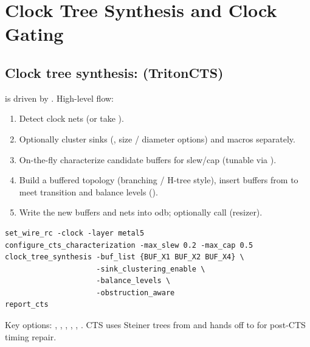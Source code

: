 \chapter{Clock Tree Synthesis and Clock Gating}
\label{ch:cts}


\section{Clock tree synthesis:  (TritonCTS)}

 is driven by . High-level flow:

\begin{enumerate}
  \item Detect clock nets (or take ).
  \item Optionally cluster sinks (, size /
        diameter options) and macros separately.
  \item On-the-fly characterize candidate buffers for slew/cap (tunable via
        ).
  \item Build a buffered topology (branching / H-tree style), insert buffers
        from  to meet transition and balance levels
        ().
  \item Write the new buffers and nets into odb; optionally call
         (resizer).
\end{enumerate}

\begin{lstlisting}[style=ortcl]
set_wire_rc -clock -layer metal5
configure_cts_characterization -max_slew 0.2 -max_cap 0.5
clock_tree_synthesis -buf_list {BUF_X1 BUF_X2 BUF_X4} \
                     -sink_clustering_enable \
                     -balance_levels \
                     -obstruction_aware
report_cts
\end{lstlisting}

Key options: , ,
, , ,
. CTS uses Steiner trees from  and hands off to
\pkg{src/rsz} for post-CTS timing repair.

